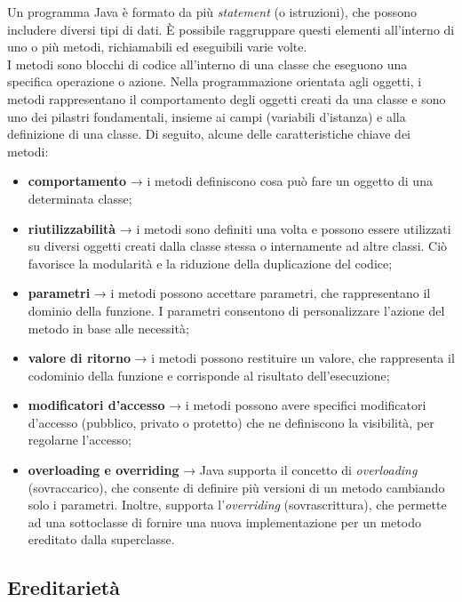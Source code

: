 Un programma Java è formato da più \textit{statement} (o istruzioni), che possono includere diversi tipi di dati. \`E possibile raggruppare questi elementi all'interno di uno o più metodi, richiamabili ed eseguibili varie volte.\\
I metodi sono blocchi di codice all’interno di una classe che eseguono una specifica operazione o azione. Nella programmazione orientata agli oggetti, i metodi rappresentano il comportamento degli oggetti creati da una classe e sono uno dei pilastri fondamentali, insieme ai campi (variabili d’istanza) e alla definizione di una classe.\cite{JAVA_educative}\cite{JAVA_w3schools2} Di seguito, alcune delle caratteristiche chiave dei metodi:
\begin{itemize}
    \item \textbf{comportamento} → i metodi definiscono cosa può fare un oggetto di una determinata classe;
    \item \textbf{riutilizzabilità} → i metodi sono definiti una volta e possono essere utilizzati su diversi oggetti creati dalla classe stessa o internamente ad altre classi. Ciò favorisce la modularità e la riduzione della duplicazione del codice;
    \item \textbf{parametri} → i metodi possono accettare parametri, che rappresentano il dominio della funzione. I parametri consentono di personalizzare l’azione del metodo in base alle necessità;
    \item \textbf{valore di ritorno} → i metodi possono restituire un valore, che rappresenta il codominio della funzione e corrisponde al risultato dell’esecuzione;
    \item \textbf{modificatori d’accesso} → i metodi possono avere specifici modificatori d’accesso (pubblico, privato o protetto) che ne definiscono la visibilità, per regolarne l’accesso;
    \item \textbf{overloading e overriding} → Java supporta il concetto di \textit{overloading} (sovraccarico), che consente di definire più versioni di un metodo cambiando solo i parametri. Inoltre, supporta l’\textit{overriding} (sovrascrittura), che permette ad una sottoclasse di fornire una nuova implementazione per un metodo ereditato dalla superclasse.
\end{itemize}

\subsection{Ereditarietà}

